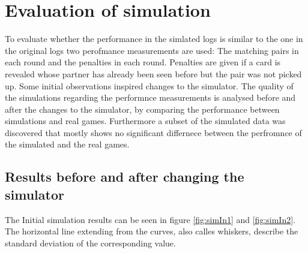 \section{Evaluation of simulation}
\label{evaluation_of_simulation}
To evaluate whether the performance in the simlated logs is similar to the one in the original logs two perofmance measurements are used: The matching pairs in each round and the penalties in each round. Penalties are given if a card is revealed whose partner has already been seen before but the pair was not picked up. Some initial observations inspired changes to the simulator. The quality of the simulations regarding the performnce measurements is analysed before and after the changes to the simulator, by comparing the performance between simulations and real games. Furthermore a subset of the simulated data was discovered that mostly shows no significant differnece between the perfromnce of the simulated and the real games.

\subsection{Results before and after changing the simulator}
\label{results_before_and_after_changing_the_simulator}
The Initial simulation results can be seen in figure \ref{fig:simIn1} and \ref{fig:simIn2}. The horizontal line extending from the curves, also calles whiskers, describe the standard deviation of the corresponding value. 

